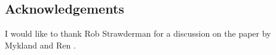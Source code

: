 \documentclass{amsart}
\theoremstyle{plain}
\theoremstyle{definition}
\begin{document}
\subsection*{Acknowledgements}
I would like to thank Rob Strawderman for a discussion on the paper by Mykland and Ren \cite{mykland-ren}.






\end{document}
